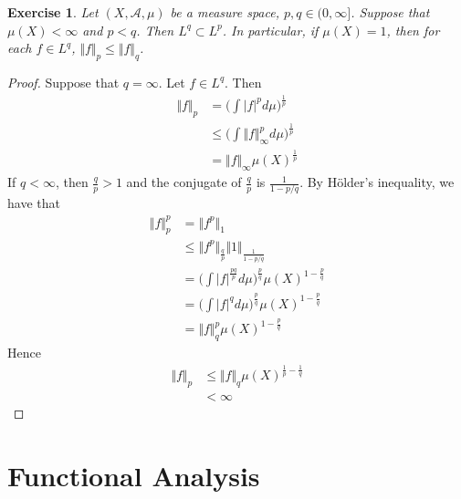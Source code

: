 \documentclass[12pt]{amsart}
\newtheorem{ex}[thm]{Exercise}
\newcommand{\MA}{\mathcal{A}}
\newcommand{\n}{\Vert}
\begin{document}
\begin{ex}
Let $(X, \MA, \mu)$ be a measure space, $p,q \in (0, \infty]$. Suppose that $\mu(X) < \infty$ and $p < q$. Then $L^q \subset L^p$. In particular, if $\mu(X) = 1$, then for each $f \in L^q$, $\n f\n_p \leq \n f\n_q$.
\end{ex}

\begin{proof}
Suppose that $q = \infty$. Let $f \in L^q$. Then
\begin{align*}
\n f \n_p 
&= \bigg(\int \vert f \vert^p d \mu \bigg)^{\frac{1}{p}} \\
& \leq \bigg(\int \n  f \n_{\infty} ^p d \mu \bigg)^{\frac{1}{p}} \\
&= \n f \n_{\infty} \mu(X)^{\frac{1}{p}}
\end{align*} 
If $q < \infty$, then $\frac{q}{p} > 1$ and the conjugate of $\frac{q}{p}$ is $\frac{1}{1- p/q}$. By Hölder's inequality, we have that 
\begin{align*}
\n f \n_p^p 
&= \n f^p \n_1 \\
&\leq \n f^p \n_{\frac{q}{p}} \n 1 \n_{\frac{1}{1-p/q}} \\
&= \bigg(\int |f|^{\frac{pq}{p}} d \mu \bigg)^{\frac{p}{q}} \mu(X)^{1-\frac{p}{q}} \\
&= \bigg(\int |f|^{q} d \mu \bigg)^{\frac{p}{q}}\mu(X)^{1-\frac{p}{q}} \\
&= \n f \n_q^p\mu(X)^{1-\frac{p}{q}}
\end{align*}
Hence 
\begin{align*}
\n f \n_p 
&\leq \n f \n_q\mu(X)^{\frac{1}{p}-\frac{1}{q}} \\
&< \infty
\end{align*}
\end{proof}






























\section{Functional Analysis}
\end{document}
